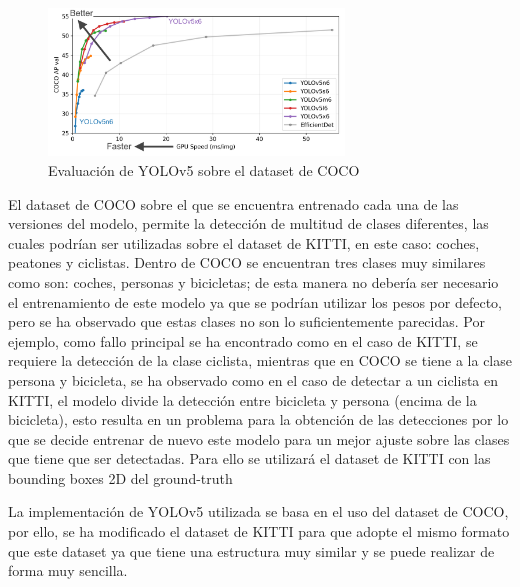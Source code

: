 \begin{figure}[H]
    \centering
    \includegraphics[width=0.7\textwidth]{Book/figures/5_deteccion2d/yolov5_eval.png}
    \caption{Evaluación de YOLOv5 sobre el dataset de COCO}
    \label{fig:Evaluación de YOLOv5 sobre el dataset de COCO}
\end{figure}

El dataset de COCO sobre el que se encuentra entrenado cada una de las versiones del modelo, permite la detección de multitud de clases diferentes, las cuales podrían ser utilizadas sobre el dataset de KITTI, en este caso: coches, peatones y ciclistas. Dentro de COCO se encuentran tres clases muy similares como son: coches, personas y bicicletas; de esta manera no debería ser necesario el entrenamiento de este modelo ya que se podrían utilizar los pesos por defecto, pero se ha observado que estas clases no son lo suficientemente parecidas. Por ejemplo, como fallo principal se ha encontrado como en el caso de KITTI, se requiere la detección de la clase ciclista, mientras que en COCO se tiene a la clase persona y bicicleta, se ha observado como en el caso de detectar a un ciclista en KITTI, el modelo divide la detección entre bicicleta y persona (encima de la bicicleta), esto resulta en un problema para la obtención de las detecciones por lo que se decide entrenar de nuevo este modelo para un mejor ajuste sobre las clases que tiene que ser detectadas. Para ello se utilizará el dataset de KITTI con las bounding boxes 2D del ground-truth 

La implementación de YOLOv5 utilizada se basa en el uso del dataset de COCO, por ello, se ha modificado el dataset de KITTI para que adopte el mismo formato que este dataset ya que tiene una estructura muy similar y se puede realizar de forma muy sencilla.

